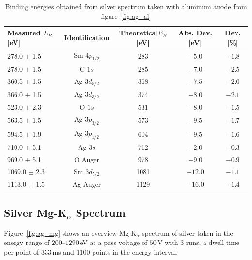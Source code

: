 \documentclass[a4paper,10pt]{scrartcl}
\begin{document}
\begin{table}[h]
\begin{center}
\begin{tabular}{lcccc}
\toprule
Measured $E_{B}$ [eV]        & Identification & Theoretical$E_{B}$ [eV] & Abs. Dev. [eV] & Dev. [\%]\\
\midrule
\phantom{0}278.0 $\pm$ 1.5   & Sm $4p_{1/2}$  & 283                     & $-5.0$         & $-1.8$\\
\phantom{0}278.0 $\pm$ 1.5   & C $1s$         & 285                     & $-7.0$         & $-2.5$\\
\phantom{0}360.5 $\pm$ 1.5   & Ag $3d_{5/2}$  & 368                     & $-7.5$         & $-2.0$\\
\phantom{0}366.0 $\pm$ 1.5   & Ag $3d_{3/2}$  & 374                     & $-8.0$         & $-2.1$\\
\phantom{0}523.0 $\pm$ 2.3   & O $1s$         & 531                     & $-8.0$         & $-1.5$\\
\phantom{0}563.5 $\pm$ 1.5   & Ag $3p_{3/2}$  & 573                     & $-9.5$         & $-1.7$\\
\phantom{0}594.5 $\pm$ 1.9   & Ag $3p_{1/2}$  & 604                     & $-9.5$         & $-1.6$\\
\phantom{0}710.0 $\pm$ 5.1   & Ag $3s$        & 712                     & $-2.0$         & $-0.3$\\
\phantom{0}969.0 $\pm$ 5.1   & O Auger        & 978                     & $-9.0$         & $-0.9$\\
1069.0 $\pm$ 2.3             & Sm $3d_{5/2}$  & 1081                    & $-12.0$        & $-1.1$\\
1113.0 $\pm$ 1.5             & Ag Auger       & 1129                    & $-16.0$        & $-1.4$\\
\bottomrule
\end{tabular}
\end{center}
\par
\caption{Binding energies obtained from silver spectrum taken with aluminum anode from figure~\ref{fig:ag_al} \label{tab:ag_al_ident}}
\end{table}

\subsection*{Silver Mg-K$_{\alpha}$ Spectrum}

Figure~\ref{fig:ag_mg} shows an overview Mg-K$_{\alpha}$ spectrum of silver taken in the energy range of $200$--$1290\,$eV at a pass voltage of $50\,$V with 3 runs, a dwell time per point of $333\,$ms and 1100 points in the energy interval. 
\end{document}
